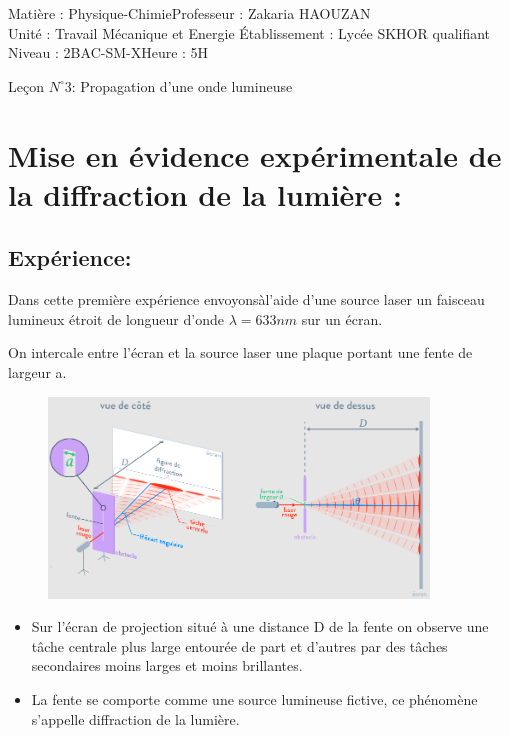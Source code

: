 \documentclass[12pt]{article}
\author{Zakaria HAOUZAN}
\date{\today}
\newcommand\headerMe[2]{\noindent{}#1\hfill#2}
\begin{document}
\headerMe{Matière : Physique-Chimie}{Professeur : Zakaria HAOUZAN}\\
\headerMe{Unité : Travail Mécanique et Energie }{Établissement : Lycée SKHOR qualifiant}\\
\headerMe{Niveau : 2BAC-SM-X}{Heure : 5H}\\

\begin{center}

    \Large{Leçon $N^{\circ} 3 $: \color{red}Propagation d'une onde lumineuse }
\end{center}
\section{Mise en évidence expérimentale de la diffraction de la lumière : }

\subsection{Expérience: }

Dans cette première expérience envoyonsàl'aide d'une source laser un faisceau lumineux étroit de longueur d'onde $\lambda = 633nm$ sur un écran.

On intercale entre l'écran et la source laser une plaque portant une fente de largeur a.
\begin{figure}[h]

	\begin{center}
		\includegraphics[width=0.9\textwidth]{./img/OLexperience.png}
	\end{center}
	\vspace{-1.5cm}
\end{figure}

\begin{itemize}
	\item Sur l'écran de projection situé à une distance D de la fente on observe une tâche centrale plus large entourée de part et
d'autres par des tâches secondaires moins larges et moins brillantes.

\item La fente se comporte comme une source lumineuse fictive, ce phénomène s'appelle diffraction de la lumière.
\end{itemize}
\end{document}
